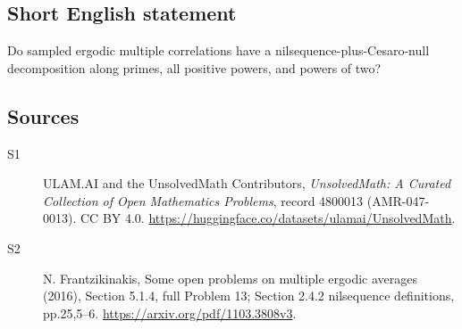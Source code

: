 \documentclass[11pt]{article}
\begin{document}
\subsection{Short English statement}
Do sampled ergodic multiple correlations have a nilsequence-plus-Cesaro-null decomposition along primes, all positive powers, and powers of two?
\subsection{Sources}
\begin{description}
\item[\hypertarget{source:4800013:1}{S1}] ULAM.AI and the UnsolvedMath Contributors, \emph{UnsolvedMath: A Curated Collection of Open Mathematics Problems}, record 4800013 (AMR-047-0013). CC BY 4.0. \url{https://huggingface.co/datasets/ulamai/UnsolvedMath}.
\item[\hypertarget{source:4800013:2}{S2}] N. Frantzikinakis, Some open problems on multiple ergodic averages (2016), Section 5.1.4, full Problem 13; Section 2.4.2 nilsequence definitions, pp.25,5--6. \url{https://arxiv.org/pdf/1103.3808v3}.
\end{description}
\label{end:4800013}
\end{document}
